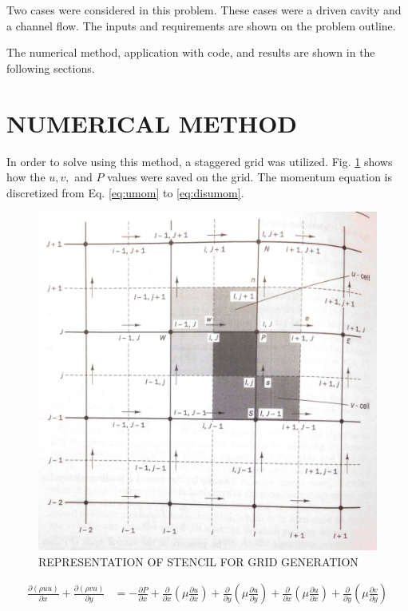 \documentclass[cleanfoot,cleanhead,onecolumn,12pt,notitlepage]{asme2e}
\begin{document}
Two cases were considered in this problem.  These cases were a driven cavity and a channel flow.  The inputs and requirements are shown on the problem outline.  

The numerical method, application with code, and results are shown in the following sections.



\section{NUMERICAL METHOD}
In order to solve using this method, a staggered grid was utilized.  Fig. \ref{fig:stencil} shows how the $u,v,$ and $P$ values were saved on the grid.  The momentum equation is discretized from Eq. \ref{eq:umom} to \ref{eq:disumom}.  

\begin{figure}[h]
\begin{center}
    \includegraphics[width=0.9\linewidth]{Stencil.jpg}
    \caption{REPRESENTATION OF STENCIL FOR GRID GENERATION}
    \label{fig:stencil}
\end{center}
\end{figure}

\begin{equation}
\begin{aligned}
\frac{\partial (\rho u u)}{\partial x} + \frac{\partial (\rho v u)}{\partial y} &=
-\frac{\partial P}{\partial x} 
+ \frac{\partial }{\partial x} \left( \mu \frac{\partial u}{\partial x} \right)
+ \frac{\partial }{\partial y} \left( \mu \frac{\partial u}{\partial y} \right)
+ \frac{\partial }{\partial x} \left( \mu \frac{\partial u}{\partial x} \right)
+ \frac{\partial }{\partial y} \left( \mu \frac{\partial v}{\partial y} \right)
\label{eq:umom}
\end{aligned}
\end{equation}
\end{document}
